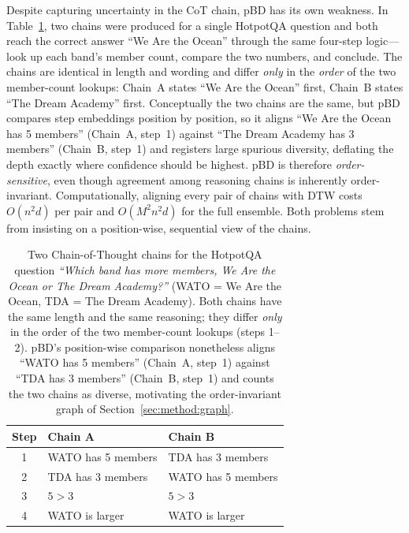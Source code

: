 \documentclass[letterpaper]{article} %
\begin{document}
Despite capturing uncertainty in the CoT chain, pBD has its own weakness. In
Table~\ref{tab:ensemble-example}, two chains were produced for a single HotpotQA
question and both reach the correct answer ``We Are the Ocean'' through the same
four-step logic---look up each band's member count, compare the two numbers, and
conclude. The chains are identical in length and wording and differ \emph{only}
in the \emph{order} of the two member-count lookups: Chain~A states ``We Are the
Ocean'' first, Chain~B states ``The Dream Academy'' first. Conceptually the two
chains are the same, but pBD compares step embeddings position by position, so it
aligns ``We Are the Ocean has 5 members'' (Chain~A, step~1) against ``The Dream
Academy has 3 members'' (Chain~B, step~1) and registers large spurious diversity,
deflating the depth exactly where confidence should be highest. pBD is therefore
\emph{order-sensitive}, even though agreement among reasoning chains is inherently
order-invariant. Computationally, aligning every pair of chains with DTW costs
$O(n^2 d)$ per pair and $O(M^2 n^2 d)$ for the full ensemble. Both problems stem
from insisting on a position-wise, sequential view of the chains.

\begin{table}[t]
  \centering
  \footnotesize
  \setlength{\tabcolsep}{6pt}
  \begin{tabular}{c|ll}
    \toprule
    Step & \textbf{Chain A} & \textbf{Chain B} \\
    \midrule
    1 & WATO has 5 members & TDA has 3 members \\
    2 & TDA has 3 members  & WATO has 5 members \\
    3 & $5 > 3$            & $5 > 3$ \\
    4 & WATO is larger     & WATO is larger \\
    \bottomrule
  \end{tabular}
  \caption{Two Chain-of-Thought chains for the HotpotQA question
  \emph{``Which band has more members, We Are the Ocean or The Dream Academy?''}
  (WATO = We Are the Ocean, TDA = The Dream Academy). Both chains have the same
  length and the same reasoning; they differ \emph{only} in the order of the two
  member-count lookups (steps 1--2). pBD's position-wise comparison nonetheless
  aligns ``WATO has 5 members'' (Chain~A, step~1) against ``TDA has 3 members''
  (Chain~B, step~1) and counts the two chains as diverse, motivating the
  order-invariant graph of Section~\ref{sec:method:graph}.}
  \label{tab:ensemble-example}
\end{table}
\end{document}
